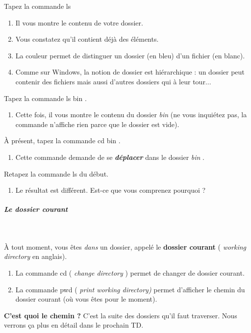 \documentclass[11pt,a4paper]{article}
\begin{document}
Tapez la commande ls 
					\begin{enumerate}
				
			\item Il vous montre le contenu de votre dossier.
			\item Vous constatez qu'il contient d\'ej\`a des \'el\'ements.
			\item La couleur permet de distinguer un dossier (en bleu) d'un fichier (en blanc).
			\item Comme
	sur Windows, la notion de dossier est hi\'erarchique : un dossier peut
	contenir des fichiers mais aussi d'autres dossiers qui \`a leur tour...
					\end{enumerate}
				
Tapez la commande ls bin .

					\begin{enumerate}
				
			\item Cette fois, il vous montre le contenu du dossier  \textit{bin}  (ne vous inqui\'etez pas, la commande n'affiche rien parce que le dossier est vide).
					\end{enumerate}
				
\`A pr\'esent, tapez la commande cd bin .

					\begin{enumerate}
				
			\item Cette commande demande de se  \textit{ \textbf{d\'eplacer} }  dans le dossier  \textit{bin} .
					\end{enumerate}
				
Retapez la commande ls  du d\'ebut.

					\begin{enumerate}
				
			\item Le r\'esultat est diff\'erent. Est-ce que vous comprenez pourquoi ?
					\end{enumerate}
				
			
		\subparagraph{Le dossier courant} 
		
					\textcolor{white}{.} \par
				
            \par
        
\`A tout moment, vous \^etes  \textit{dans}  un dossier, appel\'e le  \textbf{dossier courant}  ( \textit{working directory}  en anglais).

					\begin{enumerate}
				
			\item La commande cd  ( \textit{change directory} ) permet de changer de dossier courant.
			\item La commande pwd  ( \textit{print working directory)}  permet d'afficher le chemin du dossier courant (o\`u vous \^etes pour le moment).
					\end{enumerate}
				 \textbf{C'est quoi le chemin ?}  C'est la suite des dossiers qu'il faut traverser. Nous verrons \c ca plus en d\'etail dans le prochain TD. 
\end{document}
